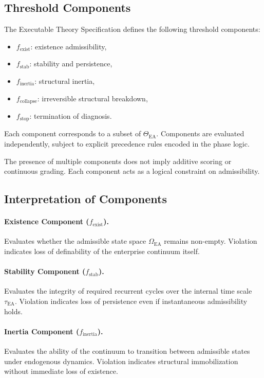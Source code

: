 \subsection{Threshold Components}

The Executable Theory Specification defines the following threshold
components:

\begin{itemize}
  \item $f_{\text{exist}}$: existence admissibility,
  \item $f_{\text{stab}}$: stability and persistence,
  \item $f_{\text{inertia}}$: structural inertia,
  \item $f_{\text{collapse}}$: irreversible structural breakdown,
  \item $f_{\text{stop}}$: termination of diagnosis.
\end{itemize}

Each component corresponds to a subset of $\Theta_{\mathrm{EA}}$.
Components are evaluated independently, subject to explicit precedence
rules encoded in the phase logic.

The presence of multiple components does not imply additive scoring or
continuous grading.
Each component acts as a logical constraint on admissibility.

\subsection{Interpretation of Components}

\paragraph{Existence Component ($f_{\text{exist}}$).}
Evaluates whether the admissible state space $\Omega_{\mathrm{EA}}$
remains non-empty.
Violation indicates loss of definability of the enterprise continuum
itself.

\paragraph{Stability Component ($f_{\text{stab}}$).}
Evaluates the integrity of required recurrent cycles over the internal
time scale $\tau_{\mathrm{EA}}$.
Violation indicates loss of persistence even if instantaneous
admissibility holds.

\paragraph{Inertia Component ($f_{\text{inertia}}$).}
Evaluates the ability of the continuum to transition between admissible
states under endogenous dynamics.
Violation indicates structural immobilization without immediate loss of
existence.


